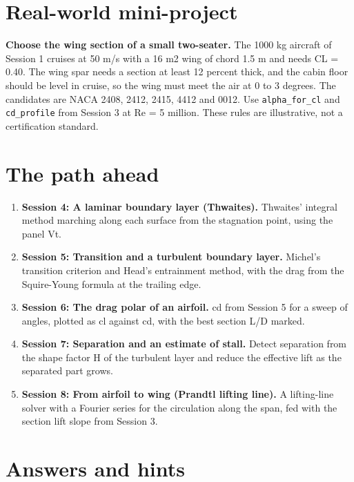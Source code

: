 \documentclass[11pt,a4paper]{article}
\begin{document}
\section{Real-world mini-project}
\textbf{Choose the wing section of a small two-seater.} The 1000 kg aircraft of Session 1 cruises at 50 m/s with a 16 m2 wing of chord 1.5 m and needs CL = 0.40. The wing spar needs a section at least 12 percent thick, and the cabin floor should be level in cruise, so the wing must meet the air at 0 to 3 degrees. The candidates are NACA 2408, 2412, 2415, 4412 and 0012. Use \texttt{alpha\_for\_cl} and \texttt{cd\_profile} from Session 3 at Re = 5 million. These rules are illustrative, not a certification standard.

\section{The path ahead}
\begin{enumerate}[nosep]
\item \textbf{Session 4: A laminar boundary layer (Thwaites).} Thwaites' integral method marching along each surface from the stagnation point, using the panel Vt.
\item \textbf{Session 5: Transition and a turbulent boundary layer.} Michel's transition criterion and Head's entrainment method, with the drag from the Squire-Young formula at the trailing edge.
\item \textbf{Session 6: The drag polar of an airfoil.} cd from Session 5 for a sweep of angles, plotted as cl against cd, with the best section L/D marked.
\item \textbf{Session 7: Separation and an estimate of stall.} Detect separation from the shape factor H of the turbulent layer and reduce the effective lift as the separated part grows.
\item \textbf{Session 8: From airfoil to wing (Prandtl lifting line).} A lifting-line solver with a Fourier series for the circulation along the span, fed with the section lift slope from Session 3.
\end{enumerate}

\section{Answers and hints}
\end{document}
